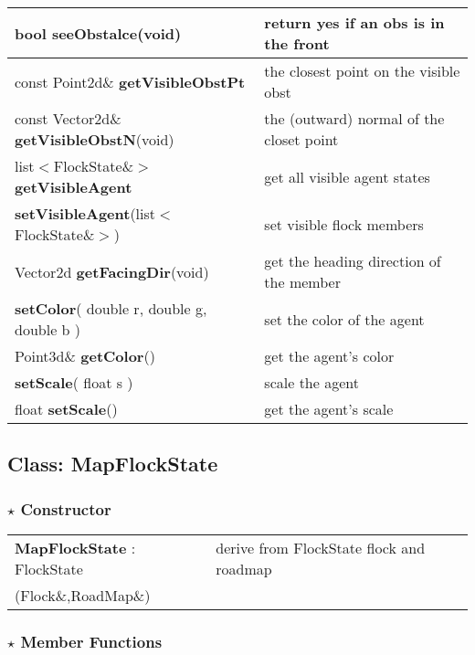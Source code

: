 \documentclass[onecolumn,10pt]{article}
\begin{document}
\begin{tabular}{|l|l|}\hline
bool {\bf seeObstalce}(void)               &  return yes if an obs is in the front\\\hline
const Point2d\& {\bf getVisibleObstPt}     &   the closest point on the visible obst\\\hline
const Vector2d\& {\bf getVisibleObstN}(void)   & the (outward) normal of the closet point\\\hline
list$<$FlockState\&$>$ {\bf getVisibleAgent}   & get all visible agent states\\\hline
{\bf setVisibleAgent}(list$<$FlockState\&$>$)  & set visible flock members\\\hline
Vector2d {\bf getFacingDir}(void)             &  get the heading direction of the member\\\hline\hline

{\bf setColor}( double r, double g, double b ) & set the color of the agent \\\hline
Point3d\& {\bf getColor}()                      & get the agent's color \\\hline
{\bf setScale}( float s )                       & scale the agent \\\hline
float {\bf setScale}()                          & get the agent's scale \\\hline

\end{tabular}

\subsection{Class: MapFlockState}
\subsubsection*{$\star$ Constructor}
\begin{tabular}{l|l}
{\bf MapFlockState} : FlockState  & derive from FlockState flock and roadmap \\
(Flock\&,RoadMap\&)        & 
\end{tabular}

\subsubsection*{$\star$ Member Functions}
\end{document}

